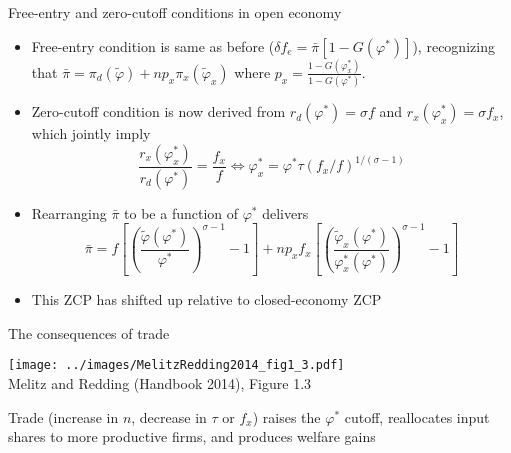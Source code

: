 \documentclass[10pt,notes=hide]{beamer}
\begin{document}
\begin{frame}{Free-entry and zero-cutoff conditions in open economy}
\begin{itemize}
\item Free-entry condition is same as before ($\delta f_e = \bar{\pi}[1-G(\varphi^*)]$), recognizing that $\bar{\pi} = \pi_d(\tilde{\varphi}) + n p_x  \pi_x(\tilde{\varphi}_x)$ where $p_x = \frac{1-G({\varphi}_x^*)}{1-G(\varphi^*)}$.
\item Zero-cutoff condition is now derived from $r_d(\varphi^*) = \sigma f$ and $r_x(\varphi^*_x) = \sigma f_x$, which jointly imply
$$ 
\frac{r_x(\varphi^*_x)}{r_d(\varphi^*)} = \frac{f_x}{f}
\iff
\varphi^*_x = \varphi^* \tau (f_x /f)^{1/(\sigma-1)}
$$
\item Rearranging $\bar{\pi}$ to be a function of $\varphi^*$ delivers
$$
\bar{\pi} 
=
f \left[\left(\frac{\tilde{\varphi}(\varphi^*)}{\varphi^*}\right)^{\sigma-1} - 1\right]
+
n p_x f_x \left[\left(\frac{\tilde{\varphi}_x(\varphi^*)}{\varphi_x^*(\varphi^*)}\right)^{\sigma-1} - 1\right]
$$
\item This ZCP has shifted up relative to closed-economy ZCP
\end{itemize}
\end{frame}
\begin{frame}{The consequences of trade}
\begin{center}
\texttt{[image: ../images/MelitzRedding2014\_fig1\_3.pdf]} \\
Melitz and Redding (Handbook 2014), Figure 1.3
\end{center}
Trade (increase in $n$, decrease in $\tau$ or $f_x$) raises the $\varphi^*$ cutoff, reallocates input shares to more productive firms, and produces welfare gains
\end{frame}
\end{document}

